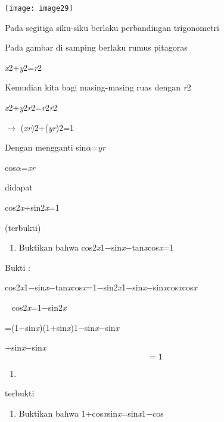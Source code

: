 \documentclass[11pt,fleqn]{book} %
\begin{document}
\noindent \texttt{[image: image29]}

\noindent Pada segitiga siku-siku berlaku perbandingan trigonometri 

\noindent Pada gambar di samping berlaku rumus pitagoras

\noindent \textit{x}2+\textit{y}2=\textit{r}2

\noindent Kemudian kita bagi masing-masing ruas dengan \textit{r}2

\noindent \textit{x}2+\textit{y}2\textit{r}2=\textit{r}2\textit{r}2

\noindent $\mathrm{\to}$ (\textit{xr})2+(\textit{yr})2=1

\noindent Dengan mengganti sin\textit{$\alpha$}=\textit{yr}

\noindent cos\textit{$\alpha$}=\textit{xr}

\noindent didapat

\noindent cos2\textit{x}+sin2\textit{x}=1

\noindent (terbukti) 

\noindent 

\noindent 

\noindent 

\begin{enumerate}
\item  Buktikan bahwa cos2\textit{x}1$\mathrm{-}$sin\textit{x}$\mathrm{-}$tan\textit{x}cos\textit{x}=1
\end{enumerate}

\noindent Bukti : 

\noindent cos2\textit{x}1$\mathrm{-}$sin\textit{x}$\mathrm{-}$tan\textit{x}cos\textit{x}=1$\mathrm{-}$sin2\textit{x}1$\mathrm{-}$sin\textit{x}$\mathrm{-}$sin\textit{x}cos\textit{x}cos\textit{x}

\noindent ~ cos2\textit{x}=1$\mathrm{-}$sin2\textit{x}

\noindent =(1$\mathrm{-}$sin\textit{x})(1+sin\textit{x})1$\mathrm{-}$sin\textit{x}$\mathrm{-}$sin\textit{x}

+sin\textit{x}$\mathrm{-}$sin\textit{x}
\[=1\] 

\begin{enumerate}
\item  ~ ~ 
\end{enumerate}

\noindent terbukti

\begin{enumerate}
\item  Buktikan bahwa 1+cos\textit{x}sin\textit{x}=sin\textit{x}1$\mathrm{-}$cos
\end{enumerate}
\end{document}
